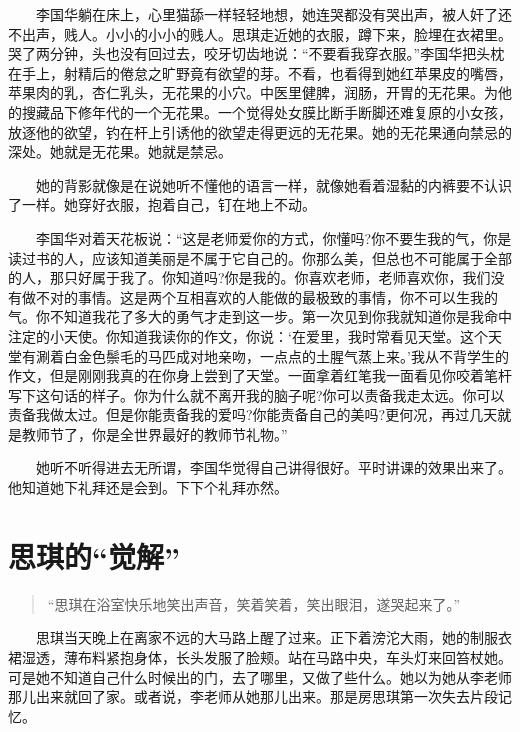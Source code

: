 \documentclass[12pt,UTF8]{ctexbook}
\begin{document}
　　李国华躺在床上，心里猫舔一样轻轻地想，她连哭都没有哭出声，被人奸了还不出声，贱人。小小的小小的贱人。思琪走近她的衣服，蹲下来，脸埋在衣裙里。哭了两分钟，头也没有回过去，咬牙切齿地说：\enquote{不要看我穿衣服。}李国华把头枕在手上，射精后的倦怠之旷野竟有欲望的芽。不看，也看得到她红苹果皮的嘴唇，苹果肉的乳，杏仁乳头，无花果的小穴。中医里健脾，润肠，开胃的无花果。为他的搜藏品下修年代的一个无花果。一个觉得处女膜比断手断脚还难复原的小女孩，放逐他的欲望，钓在杆上引诱他的欲望走得更远的无花果。她的无花果通向禁忌的深处。她就是无花果。她就是禁忌。

　　她的背影就像是在说她听不懂他的语言一样，就像她看着湿黏的内裤要不认识了一样。她穿好衣服，抱着自己，钉在地上不动。

　　李国华对着天花板说：\enquote{这是老师爱你的方式，你懂吗?你不要生我的气，你是读过书的人，应该知道美丽是不属于它自己的。你那么美，但总也不可能属于全部的人，那只好属于我了。你知道吗?你是我的。你喜欢老师，老师喜欢你，我们没有做不对的事情。这是两个互相喜欢的人能做的最极致的事情，你不可以生我的气。你不知道我花了多大的勇气才走到这一步。第一次见到你我就知道你是我命中注定的小天使。你知道我读你的作文，你说：`在爱里，我时常看见天堂。这个天堂有涮着白金色鬃毛的马匹成对地亲吻，一点点的土腥气蒸上来。'我从不背学生的作文，但是刚刚我真的在你身上尝到了天堂。一面拿着红笔我一面看见你咬着笔杆写下这句话的样子。你为什么就不离开我的脑子呢?你可以责备我走太远。你可以责备我做太过。但是你能责备我的爱吗?你能责备自己的美吗?更何况，再过几天就是教师节了，你是全世界最好的教师节礼物。}

　　她听不听得进去无所谓，李国华觉得自己讲得很好。平时讲课的效果出来了。他知道她下礼拜还是会到。下下个礼拜亦然。

\hypertarget{ux601dux742aux7684ux89c9ux89e3}{%
\section*{\texorpdfstring{思琪的\enquote{觉解}}{思琪的``觉解''}}\label{ux601dux742aux7684ux89c9ux89e3}}

\begin{quote}
\enquote{思琪在浴室快乐地笑出声音，笑着笑着，笑出眼泪，遂哭起来了。}
\end{quote}

　　思琪当天晚上在离家不远的大马路上醒了过来。正下着滂沱大雨，她的制服衣裙湿透，薄布料紧抱身体，长头发服了脸颊。站在马路中央，车头灯来回笞杖她。可是她不知道自己什么时候出的门，去了哪里，又做了些什么。她以为她从李老师那儿出来就回了家。或者说，李老师从她那儿出来。那是房思琪第一次失去片段记忆。
\end{document}
